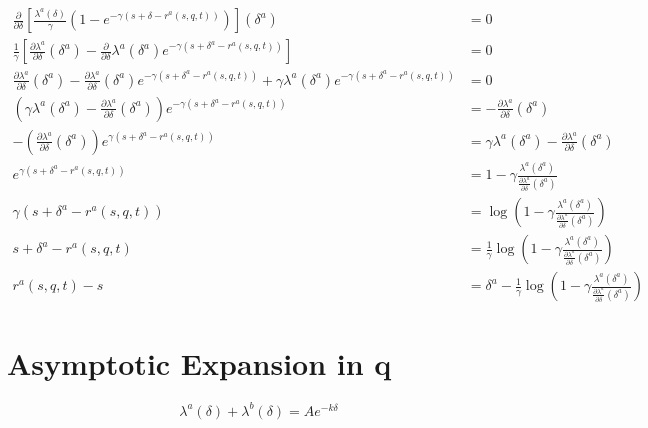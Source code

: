 \begin{align*}
    \frac{\partial}{\partial\delta}\left[\frac{\lambda^a(\delta)}{\gamma}(1-e^{-\gamma(s+\delta-r^a(s,q,t))})\right](\delta^a)&=0\\
    \frac{1}{\gamma}\left[\frac{\partial\lambda^a}{\partial\delta}(\delta^a)-\frac{\partial}{\partial\delta}\lambda^a(\delta^a)e^{-\gamma(s+\delta^a-r^a(s,q,t))}\right]&=0\\
    \frac{\partial\lambda^a}{\partial\delta}(\delta^a)-\frac{\partial\lambda^a}{\partial\delta}(\delta^a)e^{-\gamma(s+\delta^a-r^a(s,q,t))}+\gamma\lambda^a(\delta^a)e^{-\gamma(s+\delta^a-r^a(s,q,t))}&=0\\
    \left(\gamma\lambda^a(\delta^a)-\frac{\partial\lambda^a}{\partial\delta}(\delta^a)\right)e^{-\gamma(s+\delta^a-r^a(s,q,t))}&=-\frac{\partial\lambda^a}{\partial\delta}(\delta^a)\\
    -\left(\frac{\partial\lambda^a}{\partial\delta}(\delta^a)\right)e^{\gamma(s+\delta^a-r^a(s,q,t))}&=\gamma\lambda^a(\delta^a)-\frac{\partial\lambda^a}{\partial\delta}(\delta^a)\\
    e^{\gamma(s+\delta^a-r^a(s,q,t))}&=1-\gamma\frac{\lambda^a(\delta^a)}{\frac{\partial\lambda^a}{\partial\delta}(\delta^a)}\\
    \gamma(s+\delta^a-r^a(s,q,t))&=\log\left(1-\gamma\frac{\lambda^a(\delta^a)}{\frac{\partial\lambda^a}{\partial\delta}(\delta^a)}\right)\\
    s+\delta^a-r^a(s,q,t)&=\frac{1}{\gamma}\log\left(1-\gamma\frac{\lambda^a(\delta^a)}{\frac{\partial\lambda^a}{\partial\delta}(\delta^a)}\right)\\
    r^a(s,q,t)-s&=\delta^a-\frac{1}{\gamma}\log\left(1-\gamma\frac{\lambda^a(\delta^a)}{\frac{\partial\lambda^a}{\partial\delta}(\delta^a)}\right)
\end{align*}

\section{Asymptotic Expansion in q}
\begin{equation}
    \lambda^a(\delta)+\lambda^b(\delta)=Ae^{-k\delta}
\end{equation}

